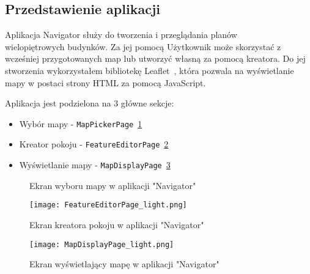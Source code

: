 \subsection{Przedstawienie aplikacji}

Aplikacja Navigator służy do tworzenia i przeglądania planów\\%
wielopiętrowych budynków.
Za jej pomocą Użytkownik może skorzystać z wcześniej przygotowanych map lub utworzyć własną za pomocą kreatora.
Do jej stworzenia wykorzystałem bibliotekę Leaflet~\cite{leafletGithub}, 
która pozwala na wyświetlanie mapy w postaci strony HTML za pomocą JavaScript.

Aplikacja jest podzielona na 3 główne sekcje: 
\begin{itemize}
    \item Wybór mapy - \verb|MapPickerPage|~\ref{img:MapPickerPage}
    \item Kreator pokoju - \verb|FeatureEditorPage|~\ref{img:FeatureEditorPage}
    \item Wyświetlanie mapy - \verb|MapDisplayPage|~\ref{img:MapDisplayPage}
\end{itemize}

\begin{figure}[h]
    \centering
    \caption{Ekran wyboru mapy w aplikacji "Navigator"}
    \label{img:MapPickerPage}
\end{figure}

\begin{figure}[ht]
    \centering
    \texttt{[image: FeatureEditorPage\_light.png]}
    \caption{Ekran kreatora pokoju w aplikacji "Navigator"}
    \label{img:FeatureEditorPage}
\end{figure}


\begin{figure}[H]
    \centering
    \texttt{[image: MapDisplayPage\_light.png]}
    \caption{Ekran wyświetlający mapę w aplikacji "Navigator"}
    \label{img:MapDisplayPage}
\end{figure}
